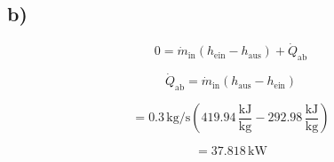 

\subsection*{b)}

\[
0 = \dot{m}_{\text{in}} (h_{\text{ein}} - h_{\text{aus}}) + \dot{Q}_{\text{ab}}
\]

\[
\dot{Q}_{\text{ab}} = \dot{m}_{\text{in}} (h_{\text{aus}} - h_{\text{ein}})
\]

\[
= 0.3 \, \text{kg/s} \left( 419.94 \, \frac{\text{kJ}}{\text{kg}} - 292.98 \, \frac{\text{kJ}}{\text{kg}} \right)
\]

\[
= 37.818 \, \text{kW}
\]